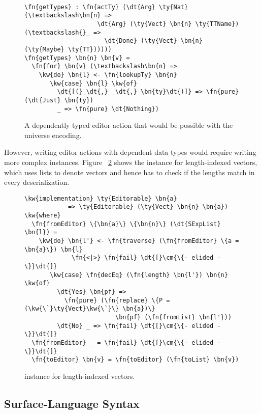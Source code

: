 \begin{figure}[H]
\begin{Verbatim}

\fn{getTypes} : \fn{actTy} (\dt{Arg} \ty{Nat} (\textbackslash\bn{n} =>
                    \dt{Arg} (\ty{Vect} \bn{n} \ty{TTName}) (\textbackslash{}_ =>
                      \dt{Done} (\ty{Vect} \bn{n} (\ty{Maybe} \ty{TT})))))
\fn{getTypes} \bn{n} \bn{v} =
  \fn{for} \bn{v} (\textbackslash\bn{n} =>
    \kw{do} \bn{l} <- \fn{lookupTy} \bn{n}
       \kw{case} \bn{l} \kw{of}
         \dt{[(}_\dt{,} _\dt{,} \bn{ty}\dt{)]} => \fn{pure} (\dt{Just} \bn{ty})
         _ => \fn{pure} \dt{Nothing})
\end{Verbatim}
\caption{A dependently typed editor action that would be possible with the universe encoding.}
\label{code:universe-dependent}
\end{figure}

However, writing editor actions with dependent data types would require writing
more complex \Editorable{} instances.  Figure ~\ref{code:editorable-vect} shows the
\Editorable{} instance for length-indexed vectors, which uses lists to denote
vectors and hence has to check if the lengths match in every deserialization.

\begin{figure}[H]
\begin{Verbatim}
\kw{implementation} \ty{Editorable} \bn{a}
            => \ty{Editorable} (\ty{Vect} \bn{n} \bn{a}) \kw{where}
  \fn{fromEditor} \{\bn{a}\} \{\bn{n}\} (\dt{SExpList} \bn{l}) =
    \kw{do} \bn{l'} <- \fn{traverse} (\fn{fromEditor} \{a = \bn{a}\}) \bn{l}
             \fn{<|>} \fn{fail} \dt{[}\cm{\{- elided -\}}\dt{]}
       \kw{case} \fn{decEq} (\fn{length} \bn{l'}) \bn{n} \kw{of}
         \dt{Yes} \bn{pf} =>
           \fn{pure} (\fn{replace} \{P = (\kw{\`}\ty{Vect}\kw{\`}\} \bn{a})\}
                         \bn{pf} (\fn{fromList} \bn{l'}))
         \dt{No} _ => \fn{fail} \dt{[}\cm{\{- elided -\}}\dt{]}
  \fn{fromEditor} _ = \fn{fail} \dt{[}\cm{\{- elided -\}}\dt{]}
  \fn{toEditor} \bn{v} = \fn{toEditor} (\fn{toList} \bn{v})
\end{Verbatim}
\caption{\Editorable{} instance for length-indexed vectors.}
\label{code:editorable-vect}
\end{figure}

\subsection{Surface-Language Syntax}

